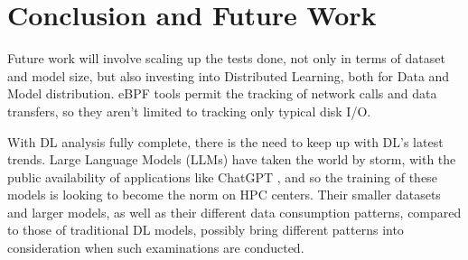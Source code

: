 \documentclass[conference]{IEEEtran}
\begin{document}




\section{Conclusion and Future Work}

Future work will involve scaling up the tests done, not only in terms of dataset and model size, but also investing into Distributed Learning, both for Data and Model distribution. eBPF tools permit the tracking of network calls and data transfers, so they aren't limited to tracking only typical disk I/O.

With DL analysis fully complete, there is the need to keep up with DL's latest trends. Large Language Models (LLMs) have taken the world by storm, with the public availability of applications like ChatGPT \cite{chatgpt}, and so the training of these models is looking to become the norm on HPC centers. Their smaller datasets and larger models, as well as their different data consumption patterns, compared to those of traditional DL models, possibly bring different patterns into consideration when such examinations are conducted.


\end{document}
